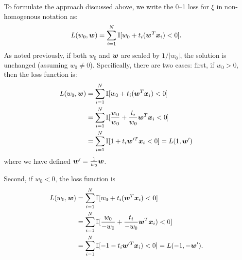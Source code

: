 To formulate the approach discussed above, we write 
the 0--1 loss for $\xi$ in non-homogenous notation as:
\begin{equation}\label{eq:loss}
L(w_0,\boldsymbol{w}) = \sum_{i=1}^N \mathbb{I} [w_0 + t_i (\boldsymbol{w}^T \boldsymbol{x}_i) < 0].
\end{equation}
%
As noted previously, if both $w_0$ and $\boldsymbol{w}$ are scaled by $1/|w_0|$, the
solution is unchanged (assuming $w_0 \neq 0$).  Specifically, there are two
cases: first, if $w_0>0$, then the loss function is:
\begin{align*}
L(w_0,\boldsymbol{w}) &= \sum_{i=1}^N \mathbb{I} [w_0 + t_i (\boldsymbol{w}^T \boldsymbol{x}_i) < 0] \\
&=\sum_{i=1}^N \mathbb{I} [\frac{w_0}{w_0} + \frac{t_i}{w_0}\boldsymbol{w}^T \boldsymbol{x}_i < 0]  \\
&= \sum_{i=1}^N \mathbb{I} [1 + t_i\boldsymbol{w}'^T \boldsymbol{x}_i < 0] = L(1, \boldsymbol{w}')
\end{align*}
where we have defined $\boldsymbol{w}' = \frac{1}{w_0}\boldsymbol{w}$. 

Second, if $w_0 < 0$, the loss function is 
\begin{align*}
L(w_0,\boldsymbol{w}) &= \sum_{i=1}^N \mathbb{I} [w_0 + t_i (\boldsymbol{w}^T \boldsymbol{x}_i) < 0] \\
&=\sum_{i=1}^N \mathbb{I} [\frac{w_0}{-w_0} + \frac{t_i}{-w_0}\boldsymbol{w}^T \boldsymbol{x}_i) < 0]  \\
&= \sum_{i=1}^N \mathbb{I} [-1 - t_i \boldsymbol{w}'^T \boldsymbol{x}_i) < 0] 
= L(-1, -\boldsymbol{w}').
\end{align*} 


